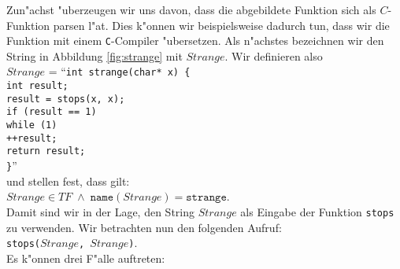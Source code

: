 Zun"achst "uberzeugen wir uns davon, dass die abgebildete Funktion sich als $C$-Funktion parsen
l"a\3t.  Dies k"onnen wir beispielsweise dadurch tun, dass wir die Funktion mit einem
\texttt{C}-Compiler "ubersetzen.  Als n"achstes bezeichnen wir den String in Abbildung 
\ref{fig:strange} mit $Strange$.  Wir definieren also \\[0.3cm]
\hspace*{1.3cm} $Strange$ = ``{\tt int strange(char* x) \{} \\
\hspace*{3.8cm}  {\tt       int result;} \\
\hspace*{3.8cm}  {\tt       result = stops(x, x);} \\
\hspace*{3.8cm}  {\tt       if (result == 1) } \\
\hspace*{4.3cm}  {\tt           while (1) } \\
\hspace*{4.8cm}  {\tt               ++result;} \\
\hspace*{3.8cm}  {\tt       return result;} \\
\hspace*{3.3cm}  {\tt   \}}'' \\[0.3cm]
und stellen fest, dass gilt: \\[0.3cm]
\hspace*{1.3cm} $Strange \in T\!F \;\wedge\; \mathtt{name}(Strange) = \mathtt{strange}$. \\[0.3cm]
Damit sind wir in der Lage, den String $Strange$ als Eingabe der Funktion \texttt{stops}
zu verwenden.  Wir betrachten nun den folgenden Aufruf: \\[0.3cm]
\hspace*{1.3cm} \texttt{stops($Strange$, $Strange$)}. \\[0.3cm]
Es k"onnen drei F"alle auftreten:
